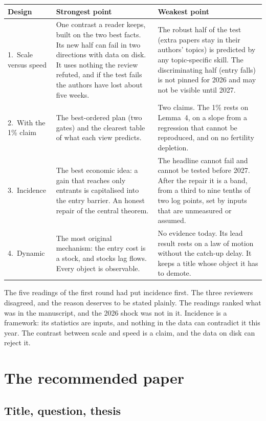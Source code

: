 \begin{center}\small
\begin{tabularx}{\textwidth}{@{}P{1.0in}LL@{}}
\toprule
Design & Strongest point & Weakest point \\
.\ Scale versus speed & One contrast a reader keeps, built on the two best facts. Its new half can fail in two directions with data on disk. It uses nothing the review refuted, and if the test fails the authors have lost about five weeks. & The robust half of the test (extra papers stay in their authors' topics) is predicted by any topic-specific skill. The discriminating half (entry falls) is not pinned for 2026 and may not be visible until 2027. \\
2.\ With the 1\% claim & The best-ordered plan (two gates) and the clearest table of what each view predicts. & Two claims. The 1\% rests on Lemma~4, on a slope from a regression that cannot be reproduced, and on no fertility depletion. \\
3.\ Incidence & The best economic idea: a gain that reaches only entrants is capitalised into the entry barrier. An honest repair of the central theorem. & The headline cannot fail and cannot be tested before 2027. After the repair it is a band, from a third to nine tenths of two log points, set by inputs that are unmeasured or assumed. \\
4.\ Dynamic & The most original mechanism: the entry cost is a stock, and stocks lag flows. Every object is observable. & No evidence today. Its lead result rests on a law of motion without the catch-up delay. It keeps a title whose object it has to demote. \\
\bottomrule
\end{tabularx}
\end{center}

The five readings of the first round had put incidence first. The three reviewers disagreed, and the reason deserves to be stated plainly. The readings ranked what was in the manuscript, and the 2026 shock was not in it. Incidence is a framework: its statistics are inputs, and nothing in the data can contradict it this year. The contrast between scale and speed is a claim, and the data on disk can reject it.

\section{The recommended paper}\label{sec:recommended}

\subsection{Title, question, thesis}

